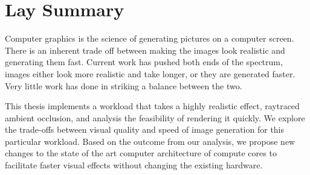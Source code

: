 

\chapter{Lay Summary}

Computer graphics is the science of generating pictures on a computer screen. There is an inherent trade off between making the images look realistic and generating them fast. Current work has pushed both ends of the spectrum, images either look more realistic and take longer, or they are generated faster. Very little work has done in striking a balance between the two. 

This thesis implements a workload that takes a highly realistic effect, raytraced ambient occlusion, and analysis the feasibility of rendering it quickly. We explore the trade-offs between visual quality and speed of image generation for this particular workload. 
Based on the outcome from our analysis, we propose new changes to the state of the art computer architecture of compute cores to facilitate faster visual effects without changing the existing hardware. 